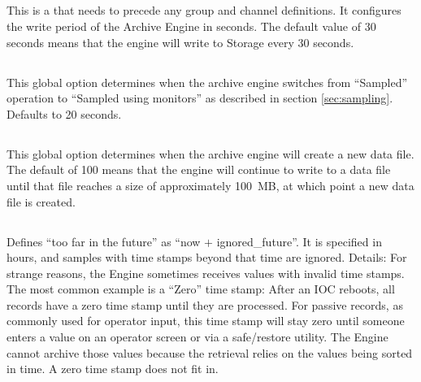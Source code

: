 



\clearpage

\subsection{}
This is a  that needs to precede any group and
channel definitions.  It configures the write period of the Archive
Engine in seconds. The default value of 30 seconds means that the
engine will write to Storage every 30 seconds.

\subsection{} \label{sec:getthreshold}
This global option determines when the archive engine switches from
``Sampled'' operation to ``Sampled using monitors'' as described in
section \ref{sec:sampling}. Defaults to 20 seconds.

\subsection{}
This global option determines when the archive engine will create a
new data file. The default of 100 means that the engine will continue
to write to a data file until that file reaches a size of
approximately 100~MB, at which point a new data file is created.

\subsection{}
Defines ``too far in the future'' as ``now $+$ ignored\_future''. It
is specified in hours, and samples with time stamps beyond that time
are ignored.
Details: For strange reasons, the Engine sometimes receives values with invalid
time stamps. The most common example is a ``Zero'' time stamp: After
an IOC reboots, all records have a zero time stamp until they are
processed. For passive records, as commonly used for operator input,
this time stamp will stay zero until someone enters a value on an
operator screen or via a safe/restore utility. The Engine cannot
archive those values because the retrieval relies on the values being
sorted in time. A zero time stamp does not fit in.

